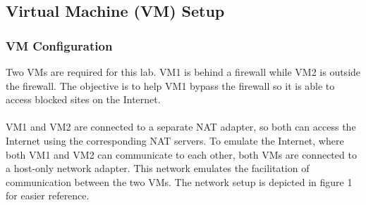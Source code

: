 \documentclass[a4paper,12pt]{article}
\begin{document}
	\subsection{Virtual Machine (VM) Setup}
	\subsubsection{VM Configuration}
	Two VMs are required for this lab. VM1 is behind a firewall while VM2 is outside the firewall. The objective is to help VM1 bypass the firewall so it is able to access blocked sites on the Internet.\\\\VM1 and VM2 are connected to a separate NAT adapter, so both can access the Internet using the corresponding NAT servers. To emulate the Internet, where both VM1 and VM2 can communicate to each other, both VMs are connected to a host-only network adapter. This network emulates the facilitation of communication between the two VMs. The network setup is depicted in figure 1 for easier reference.
	
\end{document}
